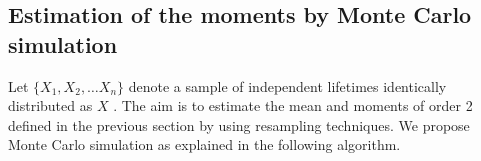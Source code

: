 \documentclass[preprint,12pt]{elsarticle}
\begin{document}
%


\subsection{Estimation of the moments by Monte Carlo simulation}
\noindent Let $\{X_1, X_2, \ldots  X_n\}$ denote a sample of independent lifetimes identically distributed as $X$ . The aim is to estimate the mean and moments of order 2 defined in the previous section by using resampling techniques. We propose Monte Carlo simulation as explained in the following algorithm. 
\end{document}
